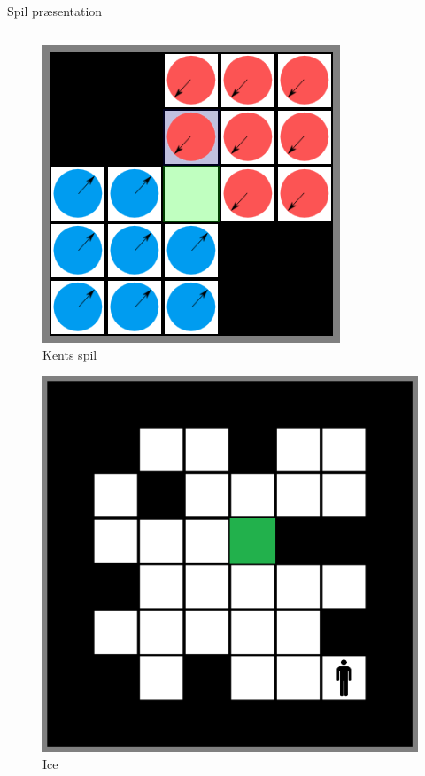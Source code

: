 \begin{frame}{Spil præsentation}
\begin{columns}
\begin{column}{.49\textwidth}
\begin{figure}[H]
   			\includegraphics[scale=0.23]{billeder/kentspil.png}
   			\caption{Kents spil}
		\end{figure}
		\begin{figure}[H]
   			\includegraphics[scale=0.18]{billeder/ice.png}
   			\caption{Ice}
		\end{figure}
	\end{column}
\end{columns}
\end{frame}


